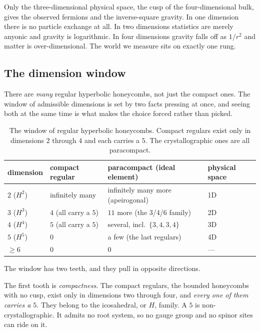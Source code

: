 \begin{result}
Only the three-dimensional physical space, the cusp of the four-dimensional bulk, gives the observed fermions and the inverse-square gravity. In one dimension there is no particle exchange at all. In two dimensions statistics are merely anyonic and gravity is logarithmic. In four dimensions gravity falls off as $1/r^2$ and matter is over-dimensional. The world we measure sits on exactly one rung.
\end{result}

\subsection{The dimension window}

There are \emph{many} regular hyperbolic honeycombs, not just the compact ones. The window of admissible dimensions is set by two facts pressing at once, and seeing both at the same time is what makes the choice forced rather than picked.

\begin{table}[ht]
\centering
\begin{tabular}{@{}llll@{}}
\toprule
dimension & compact regular & paracompact (ideal element) & physical space \\
\midrule
$2$ ($H^2$) & infinitely many & infinitely many more (apeirogonal) & 1D \\
$3$ ($H^3$) & $4$ (all carry a $5$) & $11$ more (the 3/4/6 family) & 2D \\
$4$ ($H^4$) & $5$ (all carry a $5$) & several, incl.\ $\{3,4,3,4\}$ & 3D \\
$5$ ($H^5$) & $0$ & a few (the last regulars) & 4D \\
$\geq 6$ & $0$ & $0$ & --- \\
\bottomrule
\end{tabular}
\caption{The window of regular hyperbolic honeycombs. Compact regulars exist only in dimensions $2$ through $4$ and each carries a $5$. The crystallographic ones are all paracompact.}
\label{tab:dimension-window}
\end{table}

The window has two teeth, and they pull in opposite directions.

The first tooth is \emph{compactness}. The compact regulars, the bounded honeycombs with no cusp, exist only in dimensions two through four, and \emph{every one of them carries a $5$}. They belong to the icosahedral, or $H$, family. A $5$ is non-crystallographic. It admits no root system, so no gauge group and no spinor sites can ride on it.

